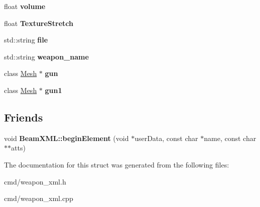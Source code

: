 \begin{DoxyCompactItemize}
\item 
float {\bfseries volume}\hypertarget{structweapon__info_a951e37b354df77f086a1e9ba1e1a9487}{}\label{structweapon__info_a951e37b354df77f086a1e9ba1e1a9487}

\item 
float {\bfseries Texture\+Stretch}\hypertarget{structweapon__info_a6d31eab2dc6f0932eec27deb52f9aa8f}{}\label{structweapon__info_a6d31eab2dc6f0932eec27deb52f9aa8f}

\item 
std\+::string {\bfseries file}\hypertarget{structweapon__info_a1a7a283b9fa5b831f53791bf4c57b596}{}\label{structweapon__info_a1a7a283b9fa5b831f53791bf4c57b596}

\item 
std\+::string {\bfseries weapon\+\_\+name}\hypertarget{structweapon__info_aca489c7e6a2d8dcbb4b3f4ba4db025c1}{}\label{structweapon__info_aca489c7e6a2d8dcbb4b3f4ba4db025c1}

\item 
class \hyperlink{classMesh}{Mesh} $\ast$ {\bfseries gun}\hypertarget{structweapon__info_adb641639dcc15b0839427cc0bcedb788}{}\label{structweapon__info_adb641639dcc15b0839427cc0bcedb788}

\item 
class \hyperlink{classMesh}{Mesh} $\ast$ {\bfseries gun1}\hypertarget{structweapon__info_a696c04440f37b5d0c82362e7347b3612}{}\label{structweapon__info_a696c04440f37b5d0c82362e7347b3612}

\end{DoxyCompactItemize}
\subsection*{Friends}
\begin{DoxyCompactItemize}
\item 
void {\bfseries Beam\+X\+M\+L\+::begin\+Element} (void $\ast$user\+Data, const char $\ast$name, const char $\ast$$\ast$atts)\hypertarget{structweapon__info_a010ac1ccfddbd7178990f23458568bc5}{}\label{structweapon__info_a010ac1ccfddbd7178990f23458568bc5}

\end{DoxyCompactItemize}


The documentation for this struct was generated from the following files\+:\begin{DoxyCompactItemize}
\item 
cmd/weapon\+\_\+xml.\+h\item 
cmd/weapon\+\_\+xml.\+cpp\end{DoxyCompactItemize}
